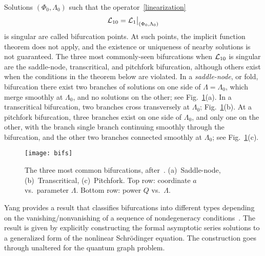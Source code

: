 \documentclass{article}
\numberwithin{equation}{section}
\numberwithin{figure}{section}
\begin{document}
Solutions $(\Phi_0,\Lambda_0)$ such that the operator~\eqref{linearization}
\begin{equation}
\mathcal{L}_{10} =  {\bigl. \mathcal{L}_1 \bigr\rvert}_{(\Phi_0,\Lambda_0)}
\label{Lgamma10}
\end{equation}
is singular are called bifurcation points. At such points, the implicit function theorem does not apply, and the existence or uniqueness of nearby solutions is not guaranteed. The three most commonly-seen bifurcations when $\mathcal{L}_{10}$ is singular are the saddle-node, transcritical, and pitchfork bifurcation, although others exist when the conditions in the theorem below are violated. In a \emph{saddle-node}, or fold, bifurcation there exist two branches of solutions on one side of $\Lambda=\Lambda_0$, which merge smoothly at $\Lambda_0$,  and no solutions on the other; see Fig.~\ref{fig:bifs}(a). In a transcritical bifurcation, two branches cross transversely at $\Lambda_0$; Fig.~\ref{fig:bifs}(b). At a pitchfork bifurcation, three branches exist on one side of $\Lambda_0$, and only one on the other, with the branch single branch continuing smoothly through the bifurcation, and the other two branches connected smoothly at $\Lambda_0$; see Fig.~\ref{fig:bifs}(c).

\begin{figure}[htbp] %
   \centering
   \texttt{[image: bifs]} 
   \caption{The three most common bifurcations, after~\cite{Yang:2012ux}. (a)~Saddle-node, (b)~Transcritical, (c)~Pitchfork. Top row: coordinate $a$ vs.\ parameter $\Lambda$. Bottom row: power $Q$ vs.\ $\Lambda$. }
 \label{fig:bifs}
\end{figure}

Yang provides a result that classifies bifurcations into different types depending on the vanishing/nonvanishing of a sequence of nondegeneracy conditions~\cite{Yang:2012ux}. The result is given by explicitly constructing the formal asymptotic series solutions to a generalized form of the nonlinear Schr\"odinger equation. The construction goes through unaltered for the quantum graph problem. 
\end{document}
